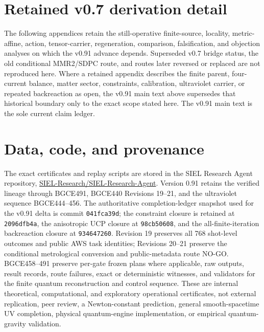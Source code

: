 \documentclass[11pt]{article}
\theoremstyle{definition}
\theoremstyle{remark}
\begin{document}
\appendix
\section*{Retained v0.7 derivation detail}

The following appendices retain the still-operative finite-source, locality, metric-affine, action, tensor-carrier, regeneration, comparison, falsification, and objection analyses on which the v0.91 advance depends. Superseded v0.7 bridge status, the old conditional MMR2/SDPC route, and routes later reversed or replaced are not reproduced here. Where a retained appendix describes the finite parent, four-current balance, matter sector, constraints, calibration, ultraviolet carrier, or repeated backreaction as open, the v0.91 main text above supersedes that historical boundary only to the exact scope stated here. The v0.91 main text is the sole current claim ledger.



\section*{Data, code, and provenance}

The exact certificates and replay scripts are stored in the SIEL Research Agent repository,
\href{https://github.com/SIEL-Research/SIEL-Research-Agent}{SIEL-Research/SIEL-Research-Agent}. Version 0.91 retains the verified lineage through BGCE491, BGCE440 Revisions 19--21, and the ultraviolet sequence BGCE444--456. The authoritative completion-ledger snapshot used for the v0.91 delta is commit \texttt{041fca39d}; the constraint closure is retained at \texttt{2096dfb4a}, the anisotropic UCP closure at \texttt{98cb50608}, and the all-finite-iteration backreaction closure at \texttt{934647260}. Revision 19 preserves all 768 shot-level outcomes and public AWS task identities; Revisions 20--21 preserve the conditional metrological conversion and public-metadata route NO-GO. BGCE458--491 preserve per-gate frozen plans where applicable, raw outputs, result records, route failures, exact or deterministic witnesses, and validators for the finite quantum reconstruction and control sequence. These are internal theoretical, computational, and exploratory operational certificates, not external replication, peer review, a Newton-constant prediction, general smooth-spacetime UV completion, physical quantum-engine implementation, or empirical quantum-gravity validation.
\end{document}
